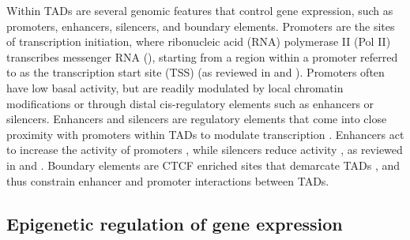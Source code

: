 Within TADs are several genomic features that control gene expression, such as promoters, enhancers, silencers, and boundary elements. Promoters are the sites of transcription initiation, where ribonucleic acid (RNA) polymerase II (Pol II) transcribes messenger RNA (\cite{roeder_multiple_1969}), starting from a region within a promoter referred to as the transcription start site (TSS) (as reviewed in \cite{cramer_organization_2019} and \cite{haberle_eukaryotic_2018}). Promoters often have low basal activity, but are readily modulated by local chromatin modifications or through distal cis-regulatory elements such as enhancers or silencers. Enhancers and silencers are regulatory elements that come into close proximity with promoters within TADs to modulate transcription \citep{sanyal_long-range_2012, mifsud_mapping_2015}. Enhancers act to increase the activity of promoters \citep{banerji_expression_1981}, while silencers reduce activity \citep{brand_characterization_1985}, as reviewed in \cite{haberle_eukaryotic_2018} and \cite{segert_transcriptional_2021}. Boundary elements are CTCF enriched sites that demarcate TADs \citep{dixon_topological_2012, braccioli_ctcf_2019}, and thus constrain enhancer and promoter interactions between TADs. 

\subsection{Epigenetic regulation of gene expression}


